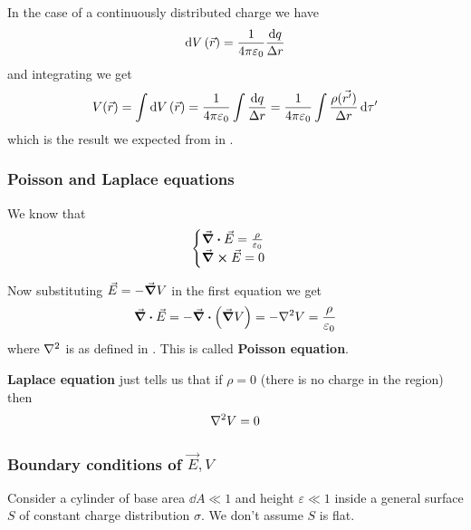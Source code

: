 \documentclass[12pt]{extarticle}
\begin{document}
In the case of a continuously distributed charge we have
\begin{equation}
    \dd{V}(\vec r) = \frac{1}{4 \pi \varepsilon_0} \frac{\dd{q}}{\Delta r}
\end{equation}
and integrating we get
\begin{equation}
    V(\vec r) = \int \dd{V}(\vec r) = \frac{1}{4 \pi \varepsilon_0} \int \frac{\dd{q}}{\Delta r} = \frac{1}{4 \pi \varepsilon_0} \int \frac{\rho(\vec {r'})}{\Delta r} \dd{\tau '}
\end{equation}
which is the result we expected from  in .

\subsubsection{Poisson and Laplace equations}

We know that
\begin{equation}
    \begin{cases}
        \div \vec E = \frac{\rho}{\varepsilon_0} \\
        \curl \vec E = 0
    \end{cases}
\end{equation}

Now substituting $\vec E = - \grad V$ in the first equation we get
\begin{equation}
    \label{eq:poisson}
    \div \vec E = - \div (\grad V) = - \laplacian V = \frac{\rho}{\varepsilon_0}
\end{equation}
where $\laplacian{}$ is as defined in .
This is called \textbf{Poisson equation}.

\textbf{Laplace equation} just tells us that if $\rho = 0$ (there is no charge in the region) then
\begin{equation}
    \laplacian V = 0
\end{equation}

\subsubsection{Boundary conditions of \texorpdfstring{$\vec E, V$}{the electric field and the potential}}

Consider a cylinder of base area $\dd A \ll 1$ and height $ \varepsilon \ll 1$ inside a general surface $S$ of constant charge distribution $\sigma$.
We don't assume $S$ is flat.
\end{document}
